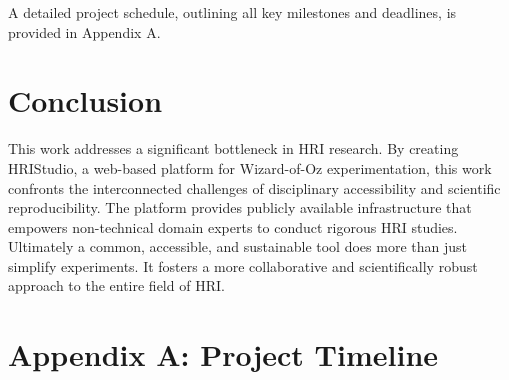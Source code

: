 \documentclass[numbib]{buthesis_p}  %
\begin{document}
A detailed project schedule, outlining all key milestones and deadlines, is provided in Appendix A.

\section{Conclusion}

This work addresses a significant bottleneck in HRI research. By creating HRIStudio, a web-based platform for Wizard-of-Oz experimentation, this work confronts the interconnected challenges of disciplinary accessibility and scientific reproducibility. The platform provides publicly available infrastructure that empowers non-technical domain experts to conduct rigorous HRI studies. Ultimately a common, accessible, and sustainable tool does more than just simplify experiments. It fosters a more collaborative and scientifically robust approach to the entire field of HRI.
\newpage



\newpage
\appendix
\section*{Appendix A: Project Timeline}
\label{app:timeline}
\end{document}
